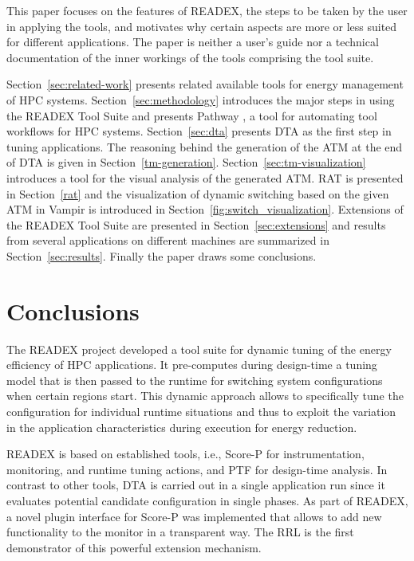 \documentclass[runningheads]{llncs}
\begin{document}
This paper focuses on the features of READEX, the steps to be taken by the user in applying the tools, and motivates why certain aspects are more or less suited for different applications. The paper is neither a user's guide nor a technical documentation of the inner workings of the tools comprising the tool suite. 

Section~\ref{sec:related-work} presents related available tools for energy management of HPC systems. Section~\ref{sec:methodology} introduces the major steps in using the READEX Tool Suite and presents Pathway \cite{Pathway:Petkov13}, a tool for automating tool workflows for HPC systems. Section~\ref{sec:dta} presents DTA as the first step in tuning applications. The reasoning behind the generation of the ATM at the end of DTA is given in Section~\ref{tm-generation}. Section~\ref{sec:tm-visualization} introduces a tool for the visual analysis of the generated ATM. RAT is presented in Section~\ref{rat} and the visualization of dynamic switching based on the given ATM in Vampir is introduced in Section~\ref{fig:switch_visualization}. Extensions of the READEX Tool Suite are presented in Section~\ref{sec:extensions} and results from several applications on different machines are summarized in Section~\ref{sec:results}. Finally the paper draws some conclusions. 


















\section{Conclusions} \label{sec:conclusions}

The READEX project developed a tool suite for dynamic tuning of the energy efficiency of HPC applications. It pre-computes during design-time a tuning model that is then passed to the runtime for switching system configurations when certain regions start. This dynamic approach allows to specifically tune the configuration for individual runtime situations and thus to exploit the variation in the application characteristics during execution for energy reduction. 

READEX is based on established tools, i.e., Score-P for instrumentation, monitoring, and runtime tuning actions, and PTF for design-time analysis. In contrast to other tools, DTA is carried out in a single application run since it evaluates potential candidate configuration in single phases. As part of READEX, a novel plugin interface for Score-P was implemented that allows to add new functionality to the monitor in a transparent way. The RRL is the first demonstrator of this powerful extension mechanism.
\end{document}
